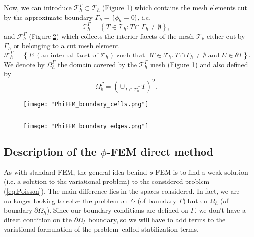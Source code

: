 Now, we can introduce $\mathcal{T}_h^\Gamma\subset \mathcal{T}_h$ (Figure \ref{space4}) which contains the mesh elements cut by the
approximate boundary $\Gamma_h = \{\phi_h=0\}$, i.e. 
\begin{equation*}
	\mathcal{T}_h^\Gamma=\left\{T\in \mathcal{T}_h:T\cap\Gamma_h\ne\emptyset\right\},
\end{equation*}
and $\mathcal{F}_h^\Gamma$ (Figure \ref{space5}) which collects the interior facets of the mesh $\mathcal{T}_h$ either cut by $\Gamma_h$ or belonging to a cut mesh element
\begin{equation*}
	\mathcal{F}_h^\Gamma=\left\{E\;(\text{an internal facet of } \mathcal{T}_h) \text{ such that } \exists T\in \mathcal{T}_h:T\cap\Gamma_h\ne\emptyset \text{ and } E\in\partial T\right\}.
\end{equation*}
We denote by $\Omega_h^\Gamma$ the domain covered by the $\mathcal{T}_h^\Gamma$ mesh (Figure \ref{space4}) and also defined by
\begin{equation*}
	\Omega_h^\Gamma=\left(\cup_{T\in\mathcal{T}_h^\Gamma}T\right)^O.
\end{equation*}

\begin{minipage}{0.48\linewidth}
	\begin{figure}[H]
		\centering
		\texttt{[image: "PhiFEM\_boundary\_cells.png"]}
		\label{space4}
	\end{figure}
\end{minipage} $\qquad$
\begin{minipage}{0.48\linewidth}
	\begin{figure}[H]
		\centering
		\texttt{[image: "PhiFEM\_boundary\_edges.png"]}
		\label{space5}
	\end{figure}
\end{minipage}

\subsection{Description of the $\phi$-FEM direct method} \label{FEMs.PhiFEM.direct_method}

As with standard FEM, the general idea behind $\phi$-FEM is to find a weak solution (i.e. a solution to the variational problem) to the considered problem (\ref{eq.Poisson}). The main difference lies in the spaces considered. In fact, we are no longer looking to solve the problem on $\Omega$ (of boundary $\Gamma$) but on $\Omega_h$ (of boundary $\partial\Omega_h$). Since our boundary conditions are defined on $\Gamma$, we don't have a direct condition on the $\partial\Omega_h$ boundary, so we will have to add terms to the variational formulation of the problem, called stabilization terms.

